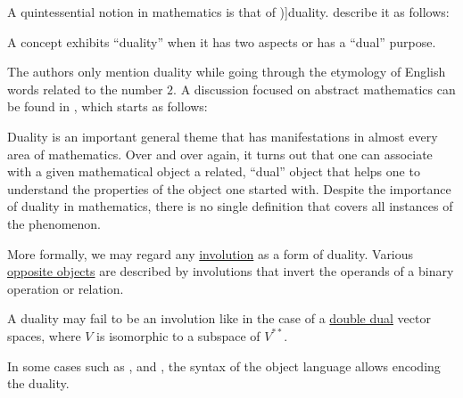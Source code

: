 \begin{concept}\label{con:duality}
  A quintessential notion in mathematics is that of \term[en=duality (\cite[188]{GowersEtAl2008PrincetonCompanion})]{duality}. \Textcite[5]{ConwayGuy1998BookOfNumbers} describe it as follows:
  \begin{displayquote}
    A concept exhibits \enquote{duality} when it has two aspects or has a \enquote{dual} purpose.
  \end{displayquote}

  The authors only mention duality while going through the etymology of English words related to the number \( 2 \). A discussion focused on abstract mathematics can be found in \cite[\S III.19]{GowersEtAl2008PrincetonCompanion}, which starts as follows:
  \begin{displayquote}
    Duality is an important general theme that has manifestations in almost every area of mathematics. Over and over again, it turns out that one can associate with a given mathematical object a related, \enquote{dual} object that helps one to understand the properties of the object one started with. Despite the importance of duality in mathematics, there is no single definition that covers all instances of the phenomenon.
  \end{displayquote}

  More formally, we may regard any \hyperref[def:morphism_invertibility/involution]{involution} as a form of duality. Various \hyperref[con:opposite_object]{opposite objects} are described by involutions that invert the operands of a binary operation or relation.

  A duality may fail to be an involution like in the case of a \hyperref[rem:double_dual]{double dual} vector spaces, where \( V \) is isomorphic to a subspace of \( V^{**} \).

  In some cases such as ,  and , the syntax of the object language allows encoding the duality.
\end{concept}

